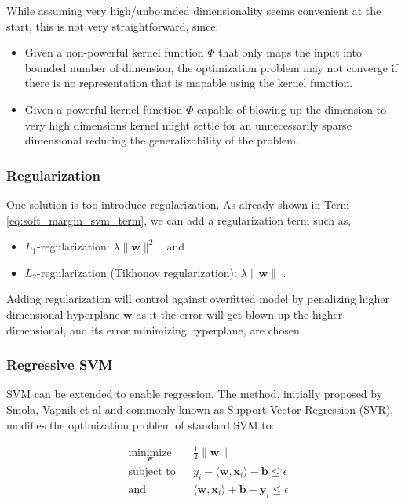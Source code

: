 \documentclass[pdftex,12pt,a4paper]{report}
\begin{document}
While assuming very high/unbounded dimensionality seems convenient at the start, this is not very straightforward, since:

\begin{itemize}
\item Given a non-powerful kernel function $\Phi$ that only maps the input into bounded number of dimension, the optimization problem may not converge if there is no representation that is mapable  using the kernel function.
\item Given a powerful kernel function $\Phi$ capable of blowing up the dimension to very high dimensions kernel might settle for an unnecessarily sparse dimensional reducing the generalizability of the problem.
\end{itemize}

\subsubsection*{Regularization}

One solution is too introduce regularization. As already shown in Term \ref{eq:soft_margin_svm_term}, we can add a regularization term such as, 

\begin{itemize}
\item $L_1$-regularization: $\lambda \| \mathbf{w} \|^2$ \cite{park2007l1}, and
\item $L_2$-regularization (Tikhonov regularization): $\lambda \| \mathbf{w} \|$ \cite{tikhonov1977solutions}.
\end{itemize}

Adding regularization will control against overfitted model by penalizing higher dimensional hyperplane $\mathbf{w}$ as it the error will get blown up the higher dimensional, and its error minimizing hyperplane, are chosen.

\subsubsection*{Regressive SVM}

SVM can be extended to enable regression. The method, initially proposed by Smola, Vapnik et al \cite{drucker1997support} and commonly known as Support Vector Regression (SVR), modifies the optimization problem of standard SVM to:

\begin{equation*}
\begin{aligned}
& \underset{\mathbf{
w}}{\text{minimize}}
& & \frac{1}{2} \| \mathbf{w} \| \\
& \text{subject to}
& & y_i - \langle \mathbf{w} , \mathbf{x}_i \rangle - \mathbf{b} \leq \epsilon \\
& \text{and} && \langle \mathbf{w} , \mathbf{x}_i\rangle + \mathbf{b} - \mathbf{y}_i \leq \epsilon \\
\end{aligned}
\end{equation*}
\end{document}
